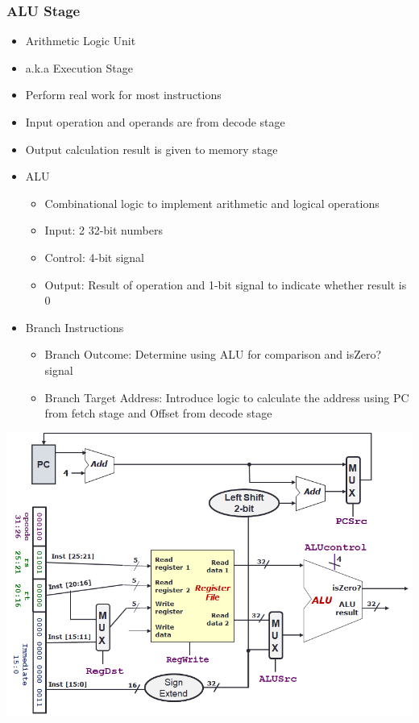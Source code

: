 \documentclass[10pt, portrait]{article}
\begin{document}
\begin{multicols*}{2}
\subsubsection{ALU Stage}
\begin{itemize}
    \item Arithmetic Logic Unit
    \item a.k.a Execution Stage
    \item Perform real work for most instructions
    \item Input operation and operands are from decode stage
    \item Output calculation result is given to memory stage
    \item ALU
    \begin{itemize}
        \item Combinational logic to implement arithmetic and logical operations
        \item Input: 2 32-bit numbers
        \item Control: 4-bit signal
        \item Output: Result of operation and 1-bit signal to indicate whether result is 0
    \end{itemize}
    \item Branch Instructions
    \begin{itemize}
        \item Branch Outcome: Determine using ALU for comparison and isZero? signal
        \item Branch Target Address: Introduce logic to calculate the address using PC from fetch stage and Offset from decode stage
    \end{itemize}
\end{itemize}
\begin{center}
    \includegraphics[width=0.7\linewidth]{alu.png}
\end{center}


\end{multicols*}
\end{document}
